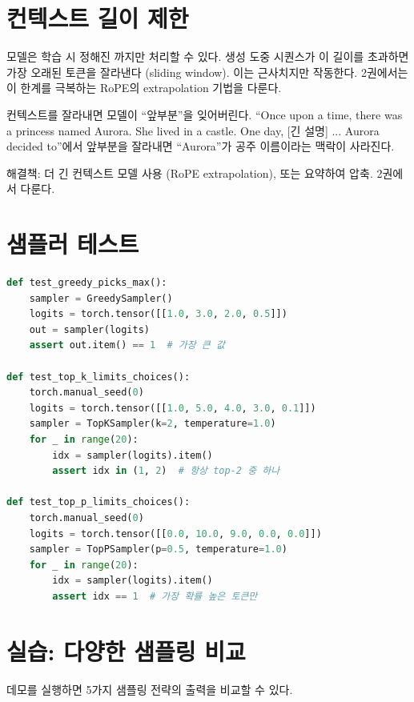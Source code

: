 \section{컨텍스트 길이 제한}

모델은 학습 시 정해진 까지만 처리할 수 있다. 생성 도중 시퀀스가 이 길이를 초과하면 가장 오래된 토큰을 잘라낸다 (sliding window). 이는 근사치지만 작동한다. 2권에서는 이 한계를 극복하는 RoPE의 extrapolation 기법을 다룬다.

\begin{warnbox}
컨텍스트를 잘라내면 모델이 ``앞부분''을 잊어버린다. ``Once upon a time, there was a princess named Aurora. She lived in a castle. One day, [긴 설명] ... Aurora decided to''에서 앞부분을 잘라내면 ``Aurora''가 공주 이름이라는 맥락이 사라진다.

해결책: 더 긴 컨텍스트 모델 사용 (RoPE extrapolation), 또는 요약하여 압축. 2권에서 다룬다.
\end{warnbox}

\section{샘플러 테스트}

\begin{lstlisting}[language=Python]
def test_greedy_picks_max():
    sampler = GreedySampler()
    logits = torch.tensor([[1.0, 3.0, 2.0, 0.5]])
    out = sampler(logits)
    assert out.item() == 1  # 가장 큰 값

def test_top_k_limits_choices():
    torch.manual_seed(0)
    logits = torch.tensor([[1.0, 5.0, 4.0, 3.0, 0.1]])
    sampler = TopKSampler(k=2, temperature=1.0)
    for _ in range(20):
        idx = sampler(logits).item()
        assert idx in (1, 2)  # 항상 top-2 중 하나

def test_top_p_limits_choices():
    torch.manual_seed(0)
    logits = torch.tensor([[0.0, 10.0, 9.0, 0.0, 0.0]])
    sampler = TopPSampler(p=0.5, temperature=1.0)
    for _ in range(20):
        idx = sampler(logits).item()
        assert idx == 1  # 가장 확률 높은 토큰만
\end{lstlisting}

\section{실습: 다양한 샘플링 비교}

 데모를 실행하면 5가지 샘플링 전략의 출력을 비교할 수 있다.

